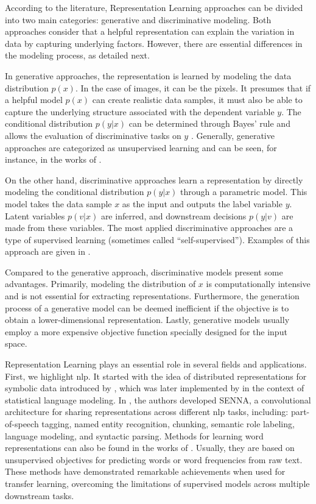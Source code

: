 According to the literature, Representation Learning approaches can be divided into two main categories: generative and discriminative modeling. Both approaches consider that a helpful representation can explain the variation in data by capturing underlying factors. However, there are essential differences in the modeling process, as detailed next.
 
In generative approaches, the representation is learned by modeling the data distribution $p(x)$. In the case of images, it can be the pixels. It presumes that if a helpful model $p(x)$ can create realistic data samples, it must also be able to capture the underlying structure associated with the dependent variable $y$. The conditional distribution $p(y|x)$ can be determined through Bayes' rule and allows the evaluation of discriminative tasks on $y$ \citep{le2020contrastive}. Generally, generative approaches are categorized as unsupervised learning and can be seen, for instance, in the works of \cite{NIPS2014_5ca3e9b1, kingma2013auto}.
 
On the other hand, discriminative approaches learn a representation by directly modeling the conditional distribution $p(y|x)$ through a parametric model. This model takes the data sample $x$ as the input and outputs the label variable $y$. Latent variables $p(v|x)$ are inferred, and downstream decisions $p(y|v)$ are made from these variables. The most applied discriminative approaches are a type of supervised learning (sometimes called ``self-supervised''). Examples of this approach are given in \citep{dosovitskiy2014discriminative, Zhang_2017_CVPR}.
 
Compared to the generative approach, discriminative models present some advantages. Primarily, modeling the distribution of $x$ is computationally intensive and is not essential for extracting representations. Furthermore, the generation process of a generative model can be deemed inefficient if the objective is to obtain a lower-dimensional representation. Lastly, generative models usually employ a more expensive objective function specially designed for the input space.
 
Representation Learning plays an essential role in several fields and applications. First, we highlight \acl{nlp}. It started with the idea of distributed representations for symbolic data introduced by \cite{hinton1986learning}, which was later implemented by \cite{bengio2000neural} in the context of statistical language modeling. In \citep{collobert2011natural}, the authors developed SENNA, a convolutional architecture for sharing representations across different \acs{nlp} tasks, including: part-of-speech tagging, named entity recognition, chunking, semantic role labeling, language modeling, and syntactic parsing. Methods for learning word representations can also be found in the works of \cite{mnih2013learning, pennington2014glove}. Usually, they are based on unsupervised objectives for predicting words or word frequencies from raw text. These methods have demonstrated remarkable achievements when used for transfer learning, overcoming the limitations of supervised models across multiple downstream tasks.
 
